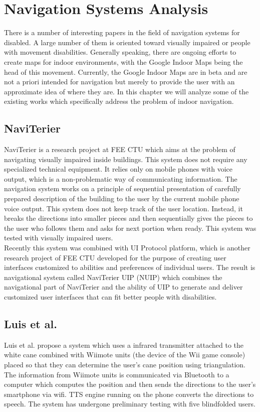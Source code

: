 \section{Navigation Systems Analysis}
There is a number of interesting papers in the field of navigation systems for disabled. A large number of them is oriented toward visually impaired or people with movement disabilities. Generally speaking, there are ongoing efforts to create maps for indoor environments, with the Google Indoor Maps being the head of this movement. Currently, the Google Indoor Maps are in beta and are not a priori intended for navigation but merely to provide the user with an approximate idea of where they are. In this chapter we will analyze some of the existing works which specifically address the problem of indoor navigation.\\

\subsection{NaviTerier}
NaviTerier \cite{naviterier} is a research project at FEE CTU which aims at the problem of navigating visually impaired inside buildings. This system does not require any specialized technical equipment. It relies only on mobile phones with voice output, which is a non-problematic way of communicating information. The navigation system works on a principle of sequential presentation of carefully prepared description of the building to the user by the current mobile phone voice output. This system does not keep track of the user location. Instead, it breaks the directions into smaller pieces and then sequentially gives the  pieces to the user who follows them and asks for next portion when ready. This system was tested with visually impaired users.\\
Recently this system was combined with UI Protocol platform, which is another research project of FEE CTU developed for the purpose of creating user interfaces customized to abilities and preferences of individual users. The result is navigational system called NaviTerier UIP (NUIP) \cite{balata} which combines the navigational part of NaviTerier and the ability of UIP to generate and deliver customized user interfaces that can fit better people with disabilities.\\

\subsection{Luis et al.}
Luis et al.\cite{luis} propose a system which uses a infrared transmitter attached to the white cane combined with Wiimote units (the device of the Wii game console) placed so that they can determine the user's cane position using triangulation. The information from Wiimote units is communicated via Bluetooth to a computer which computes the position and then sends the directions to the user's smartphone via wifi. TTS engine running on the phone converts the directions to speech. The system has undergone preliminary testing with five blindfolded users. \\

